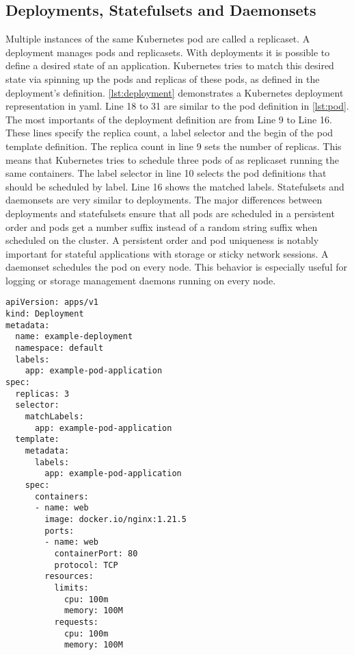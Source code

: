 \documentclass[titlepage]{report}
\begin{document}
\subsection{Deployments, Statefulsets and Daemonsets}
Multiple instances of the same Kubernetes pod are called a replicaset. A deployment manages pods and replicasets. With deployments it is possible to define a desired state of an application. Kubernetes tries to match
this desired state via spinning up the pods and replicas of these pods, as defined in the deployment's definition. \autoref{lst:deployment} demonstrates a Kubernetes deployment representation in \gls{yaml}.
Line 18 to 31 are similar to the pod definition in \autoref{lst:pod}. The most importants of the deployment definition are from Line 9 to Line 16. These lines specify the replica count, a label selector
and the begin of the pod template definition. The replica count in line 9 sets the number of replicas. This means that Kubernetes tries to schedule three pods of as replicaset running the same containers.
The label selector in line 10 selects the pod definitions that should be scheduled by label. Line 16 shows the matched labels. Statefulsets and daemonsets are very similar to deployments.
The major differences between deployments and statefulsets ensure that all pods are scheduled in a persistent order and pods get a number suffix instead of a
random string suffix when scheduled on the cluster\cite{KubernetesStatefulset}. A persistent order and pod uniqueness is notably important for stateful applications with storage or sticky network sessions. A daemonset schedules the pod on every node. 
This behavior is especially useful for logging or storage management daemons running on every node\cite{KubernetesDaemonset}. 

\begin{minipage}{\linewidth}
\begin{lstlisting}[caption={An example deployment with three replicas},label={lst:deployment}]
apiVersion: apps/v1
kind: Deployment
metadata:
  name: example-deployment
  namespace: default
  labels:
    app: example-pod-application
spec:
  replicas: 3
  selector:
    matchLabels:
      app: example-pod-application
  template:
    metadata:
      labels:
        app: example-pod-application
    spec:
      containers:
      - name: web
        image: docker.io/nginx:1.21.5
        ports:
        - name: web
          containerPort: 80
          protocol: TCP
        resources:
          limits:
            cpu: 100m
            memory: 100M
          requests:
            cpu: 100m
            memory: 100M
\end{lstlisting}
\end{minipage}
\end{document}
